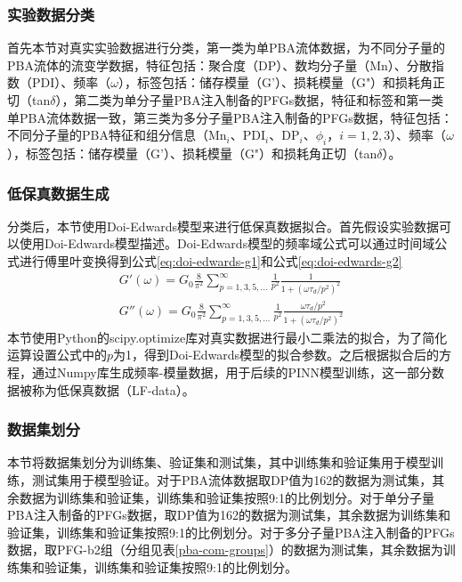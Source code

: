 \subsubsection{实验数据分类}
首先本节对真实实验数据进行分类，第一类为单PBA流体数据，为不同分子量的PBA流体的流变学数据，特征包括：聚合度（DP）、数均分子量（Mn）、分散指数（PDI）、频率（$\omega$），标签包括：储存模量（G'）、损耗模量（G"）和损耗角正切（tan$\delta$），第二类为单分子量PBA注入制备的PFGs数据，特征和标签和第一类单PBA流体数据一致，第三类为多分子量PBA注入制备的PFGs数据，特征包括：不同分子量的PBA特征和组分信息（Mn$_i$、PDI$_i$、DP$_i$、$\phi_i$，$i=1,2,3$）、频率（$\omega$），标签包括：储存模量（G'）、损耗模量（G"）和损耗角正切（tan$\delta$）。

\subsubsection{低保真数据生成}
分类后，本节使用Doi-Edwards模型来进行低保真数据拟合。首先假设实验数据可以使用Doi-Edwards模型描述。Doi-Edwards模型的频率域公式可以通过时间域公式进行傅里叶变换得到公式\eqref{eq:doi-edwards-g1}和公式\eqref{eq:doi-edwards-g2}
\begin{align}
  G'(\omega) = G_0 \frac{8}{\pi^2} \sum_{p=1,3,5,\ldots}^{\infty} \frac{1}{p^2} \frac{1}{1 + (\omega \tau_d / p^2)^2} \label{eq:doi-edwards-g1} \\
  G''(\omega) = G_0 \frac{8}{\pi^2} \sum_{p=1,3,5,\ldots}^{\infty} \frac{1}{p^2} \frac{\omega \tau_d / p^2}{1 + (\omega \tau_d / p^2)^2}
  \label{eq:doi-edwards-g2}
\end{align}
本节使用Python的scipy.optimize库对真实数据进行最小二乘法的拟合，为了简化运算设置公式中的$p$为1，得到Doi-Edwards模型的拟合参数。之后根据拟合后的方程，通过Numpy库生成频率-模量数据，用于后续的PINN模型训练，这一部分数据被称为低保真数据（LF-data）。

\subsubsection{数据集划分}
本节将数据集划分为训练集、验证集和测试集，其中训练集和验证集用于模型训练，测试集用于模型验证。对于PBA流体数据取DP值为162的数据为测试集，其余数据为训练集和验证集，训练集和验证集按照9:1的比例划分。对于单分子量PBA注入制备的PFGs数据，取DP值为162的数据为测试集，其余数据为训练集和验证集，训练集和验证集按照9:1的比例划分。对于多分子量PBA注入制备的PFGs数据，取PFG-b2组（分组见表\ref{pba-com-groups}）的数据为测试集，其余数据为训练集和验证集，训练集和验证集按照9:1的比例划分。

